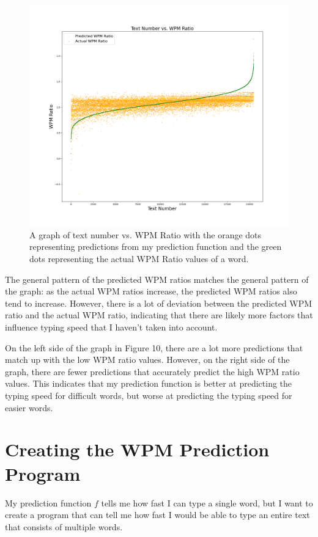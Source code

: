\documentclass[12pt]{article}
\begin{document}
\begin{figure}[H]
	\caption{A graph of text number vs. WPM Ratio with the orange dots representing predictions from my prediction function and the green dots representing the actual WPM Ratio values of a word.}
	\includegraphics[width=\textwidth]{predictions.png}
\end{figure}

The general pattern of the predicted WPM ratios matches the general pattern of the graph: as the actual WPM ratios increase, the predicted WPM ratios also tend to increase. However, there is a lot of deviation between the predicted WPM ratio and the actual WPM ratio, indicating that there are likely more factors that influence typing speed that I haven't taken into account.

On the left side of the graph in Figure 10, there are a lot more predictions that match up with the low WPM ratio values. However, on the right side of the graph, there are fewer predictions that accurately predict the high WPM ratio values. This indicates that my prediction function is better at predicting the typing speed for difficult words, but worse at predicting the typing speed for easier words.

\section*{Creating the WPM Prediction Program}

My prediction function $f$ tells me how fast I can type a single word, but I want to create a program that can tell me how fast I would be able to type an entire text that consists of multiple words.
\end{document}
